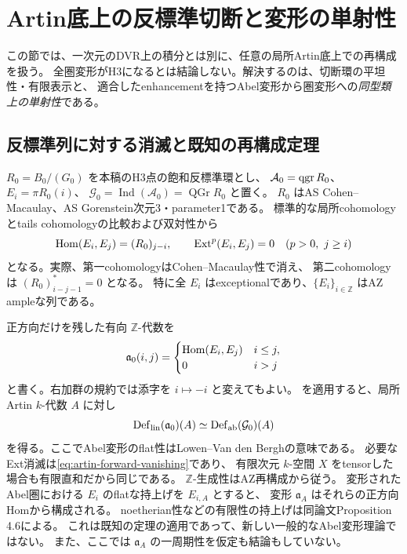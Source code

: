 \section{Artin底上の反標準切断と変形の単射性}\label{sec:artin-reconstruction}
この節では、一次元のDVR上の積分とは別に、任意の局所Artin底上での再構成を扱う。
全圏変形がH3になるとは結論しない。解決するのは、切断環の平坦性・有限表示と、
適合したenhancementを持つAbel変形から圏変形への\emph{同型類上の単射性}である。

\subsection{反標準列に対する消滅と既知の再構成定理}
$R_0=B_0/(G_0)$ を本稿のH3点の飽和反標準環とし、
$\mathcal A_0=\operatorname{qgr} R_0$、$E_i=\pi R_0(i)$、
$\mathcal G_0=\operatorname{Ind}(\mathcal A_0)=\operatorname{QGr}R_0$ と置く。
$R_0$ はAS Cohen--Macaulay、AS Gorenstein次元3・parameter1である。
標準的な局所cohomologyとtails cohomologyの比較および双対性から
\begin{equation}\label{eq:artin-forward-vanishing}
 \operatorname{Hom}(E_i,E_j)=(R_0)_{j-i},\qquad
 \operatorname{Ext}^p(E_i,E_j)=0\quad (p>0,\ j\ge i)
\end{equation}
となる。実際、第一cohomologyはCohen--Macaulay性で消え、
第二cohomologyは $(R_0)_{i-j-1}^{*}=0$ となる。
特に全 $E_i$ はexceptionalであり、$\{E_i\}_{i\in\mathbb Z}$ はAZ ampleな列である。

正方向だけを残した有向 $\mathbb Z$-代数を
\[
 \mathfrak a_0(i,j)=
 \begin{cases}\operatorname{Hom}(E_i,E_j)&i\le j,\\0&i>j\end{cases}
\]
と書く。右加群の規約では添字を $i\mapsto-i$ と変えてもよい。
\cite[Theorem 4.5]{DeDekenLowen}を適用すると、局所Artin $k$-代数 $A$ に対し
\begin{equation}\label{eq:DDL-equivalence}
 \operatorname{Def}_{\rm lin}(\mathfrak a_0)(A)
 \simeq \operatorname{Def}_{\rm ab}(\mathcal G_0)(A)
\end{equation}
を得る。ここでAbel変形のflat性はLowen--Van den Berghの意味である。
必要なExt消滅は\eqref{eq:artin-forward-vanishing}であり、
有限次元 $k$-空間 $X$ をtensorした場合も有限直和だから同じである。
$\mathbb Z$-生成性はAZ再構成から従う。
変形されたAbel圏における $E_i$ のflatな持上げを $E_{i,A}$ とすると、
変形 $\mathfrak a_A$ はそれらの正方向Homから構成される。
noetherian性などの有限性の持上げは同論文Proposition 4.6による。
これは既知の定理の適用であって、新しい一般的なAbel変形理論ではない。
また、ここでは $\mathfrak a_A$ の一周期性を仮定も結論もしていない。

